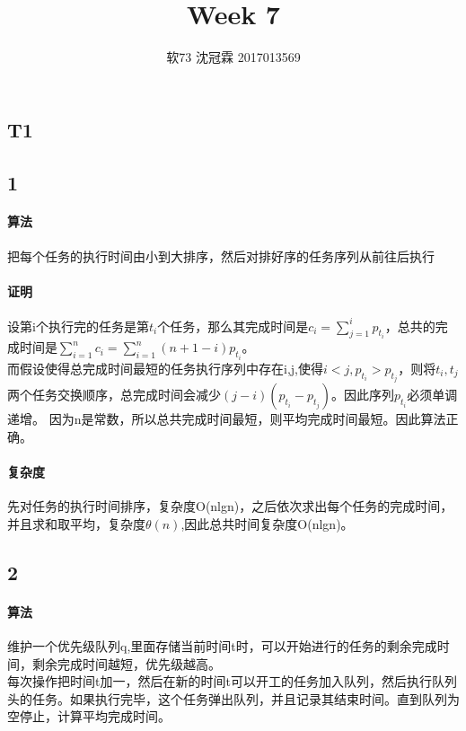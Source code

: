 \documentclass{article}
\title{Week 7}
\author{软73 沈冠霖 2017013569}
\begin{document}
\begin{CJK}{UTF8}{gkai}
\maketitle
\section{T1} 
\subsection{1}
\paragraph{算法}
把每个任务的执行时间由小到大排序，然后对排好序的任务序列从前往后执行
\paragraph{证明}
设第i个执行完的任务是第$t_{i}$个任务，那么其完成时间是$c_{i} = \sum_{j = 1}^{i}p_{t_{i}}$，总共的完成时间是$\sum_{i=1}^{n} c_{i} = \sum_{i=1}^{n}(n+1-i)p_{t_{i}}$。\\
而假设使得总完成时间最短的任务执行序列中存在i,j,使得$i<j,p_{t_{i}}>p_{t_{j}}$，则将$t_{i},t_{j}$两个任务交换顺序，总完成时间会减少$(j-i)(p_{t_{i}}-p_{t_{j}})$。因此序列$p_{t_{i}}$必须单调递增。
因为n是常数，所以总共完成时间最短，则平均完成时间最短。因此算法正确。
\paragraph{复杂度}
先对任务的执行时间排序，复杂度O(nlgn)，之后依次求出每个任务的完成时间，并且求和取平均，复杂度$\theta(n)$,因此总共时间复杂度O(nlgn)。\\
\subsection{2}
\paragraph{算法}
维护一个优先级队列q,里面存储当前时间t时，可以开始进行的任务的剩余完成时间，剩余完成时间越短，优先级越高。\\
每次操作把时间t加一，然后在新的时间t可以开工的任务加入队列，然后执行队列头的任务。如果执行完毕，这个任务弹出队列，并且记录其结束时间。直到队列为空停止，计算平均完成时间。

\end{CJK}
\end{document}
